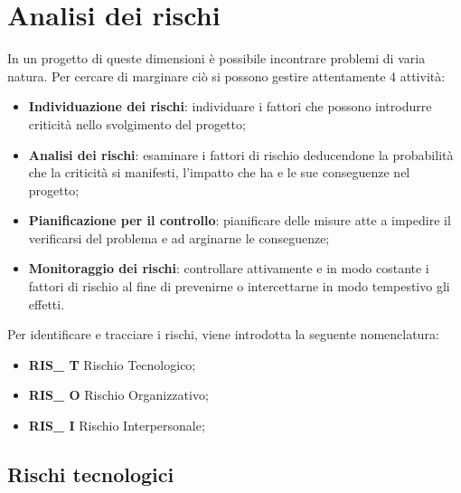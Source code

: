 \section{Analisi dei rischi}

In un progetto di queste dimensioni è possibile incontrare problemi di varia natura. Per cercare di marginare ciò si possono gestire attentamente 4 attività:

\begin{itemize}
	\item \textbf{Individuazione dei rischi}: individuare i fattori che possono introdurre criticità nello svolgimento del progetto;
	\item \textbf{Analisi dei rischi}: esaminare i fattori di rischio deducendone la probabilità che la criticità si manifesti, l'impatto che ha e le sue conseguenze nel progetto;
	\item \textbf{Pianificazione per il controllo}: pianificare delle misure atte a impedire il verificarsi del problema e ad arginarne le conseguenze;
	\item \textbf{Monitoraggio dei rischi}: controllare attivamente e in modo costante i fattori di rischio al fine di prevenirne o intercettarne in modo tempestivo gli effetti.
\end{itemize}


Per identificare e tracciare i rischi, viene introdotta la seguente nomenclatura:

\begin{itemize}
	\item \textbf{RIS\_ T} Rischio Tecnologico;
	\item \textbf{RIS\_ O} Rischio Organizzativo;
	\item \textbf{RIS\_ I} Rischio Interpersonale;
\end{itemize}

\subsection{Rischi tecnologici}




